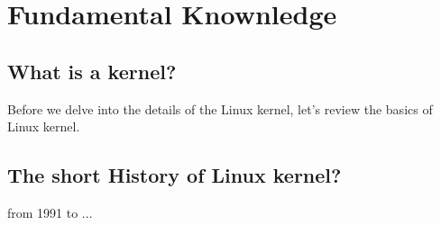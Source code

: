 \chapter{Fundamental Knownledge}
\label{chap4}
\thispagestyle{empty}

\section{What is a kernel?}
\label{Fundamental}
Before we delve into the details of the Linux kernel, let's review the basics of Linux kernel.

\section{The short History of Linux kernel?}
from 1991 to ...



































